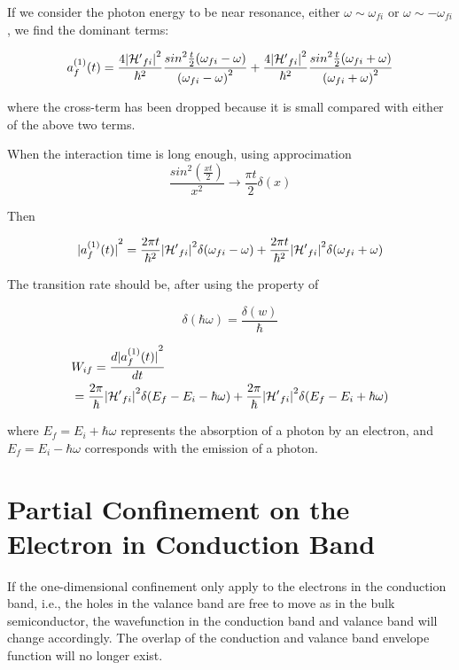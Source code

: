 If we consider the photon energy to be near resonance, either $\omega\sim\omega_{fi}$ or $\omega\sim-\omega_{fi}$, we find the dominant terms:

\begin{equation}
  {a^{(1)}_{f}(t)}=\frac{4{|{\mathcal{H}^\prime}_{fi}|}^2}{\hbar^2}\frac{{sin}^2\frac{t}{2}(\omega_{fi}-\omega)}{{(\omega_{fi}-\omega)}^2} +\frac{4{|{\mathcal{H}^\prime}_{fi}|}^2}{\hbar^2}\frac{{sin}^2\frac{t}{2}(\omega_{fi}+\omega)}{{(\omega_{fi}+\omega)}^2}
\end{equation}

where the cross-term has been dropped because it is small compared with either of the above two terms.

When the interaction time is long enough, using approcimation
\begin{equation}
  \frac{{sin}^2(\frac{xt}{2})}{x^2}\rightarrow \frac{\pi{t}}{2}\delta(x)
\end{equation}

Then

\begin{equation}
{|a^{(1)}_f(t)|}^2= \frac{2\pi{t}}{\hbar^2}{|{\mathcal{H}^\prime}_{fi}|}^2\delta(\omega_{fi}-\omega)+\frac{2\pi{t}}{\hbar^2}{|{\mathcal{H}^\prime}_{fi}|}^2\delta(\omega_{fi}+\omega)
\end{equation}

The transition rate should be, after using the property of

\begin{equation}
  \delta(\hbar\omega)=\frac{\delta(w)}{\hbar}
\end{equation}

\begin{eqnarray}
  & W_{if} = \frac{d{|a^{(1)}_f(t)|}^2}{dt} \\ 
  & = \frac{2\pi}{\hbar}{|{\mathcal{H}^\prime}_{fi}|}^2\delta(E_{f}-E_{i}-\hbar\omega)+\frac{2\pi}{\hbar}{|{\mathcal{H}^\prime}_{fi}|}^2\delta(E_{f}-E_{i}+\hbar\omega)
\end{eqnarray}

where $E_f = E_i+ \hbar\omega$ represents the absorption of a photon by an electron, and $E_f = E_i - \hbar\omega$ corresponds with the emission of a photon.

\chapter{Partial Confinement on the Electron in Conduction
Band}\label{partialconfinement}

If the one-dimensional confinement only apply to the electrons in the
conduction band, i.e., the holes in the valance band are free to move as
in the bulk semiconductor, the wavefunction in the conduction band and
valance band will change accordingly. The overlap of the conduction and
valance band envelope function will no longer exist.

